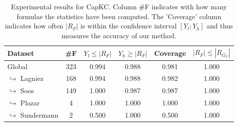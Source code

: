 \documentclass{article}
\newcommand\capkc[0]{CapKC\xspace}
\begin{document}
    
\begin{table}[h!]
        \centering
            \begin{tabular}{l|c|c|c|c|c}
                Dataset & \#F & $Y_l \leq |R_F|$ & $Y_h \geq |R_F|$ & Coverage & $|R_F| \leq |R_{G_U}|$ \\
                \hline
Global & 323 & 0.994 & 0.988 & 0.981 & 1.000 \\
$\hookrightarrow$ Lagniez \cite{D4} & 168 & 0.994 & 0.988 & 0.982 & 1.000 \\
$\hookrightarrow$ Soos \cite{soos_2024_10449477} & 149 & 1.000 & 0.987 & 0.987 & 1.000 \\
$\hookrightarrow$ Plazar \cite{Plazar2019} & 4 & 1.000 & 1.000 & 1.000 & 1.000 \\
$\hookrightarrow$ Sundermann \cite{SBK+:SPLC24} & 2 & 0.500 & 1.000 & 0.500 & 1.000 \\
        \end{tabular}
        \caption{Experimental results for \capkc.
            Column \#F indicates with how many formulae the statistics have been computed.
            The 'Coverage' column indicates how often $|R_F|$ is within the confidence interval $[Y_l; Y_h]$ and thus measures the accuracy of our method.
        }
        \label{capkc:tab:appmc}
    \end{table}
\end{document}

